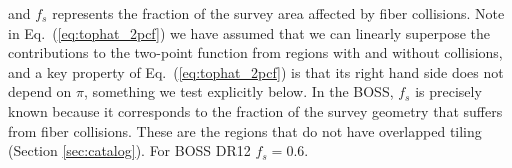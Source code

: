                                                                                                                                                                                                                                                                          \noindent and $f_s$ represents the fraction of the survey area affected by fiber 
                                                                                                                                                                                                                                                                          collisions. Note in Eq.~(\ref{eq:tophat_2pcf}) we have assumed that we can linearly superpose the contributions to the two-point function from regions with and without collisions, and a key property of Eq.~(\ref{eq:tophat_2pcf}) is that its right hand side does not depend on $\pi$, something we test explicitly below. 
                                                                                                                                                                                                                                                                          In the BOSS, $f_s$ is precisely known because 
                                                                                                                                                                                                                                                                          it corresponds to the fraction of the survey geometry that suffers from 
                                                                                                                                                                                                                                                                          fiber collisions. These are the regions that do not have overlapped tiling 
                                                                                                                                                                                                                                                                          (Section \ref{sec:catalog}). For BOSS DR12 $f_s = 0.6$. 


